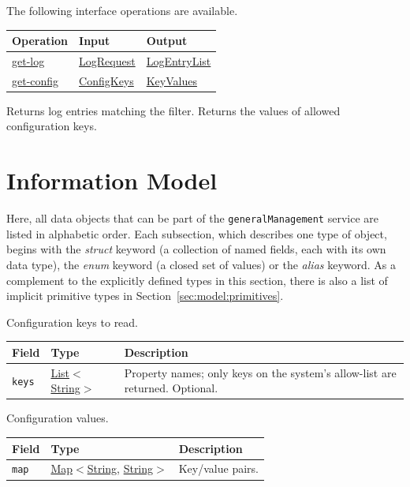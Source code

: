 \documentclass[a4paper]{arrowhead}
\newcommand{\mref}[1]{{\textcolor{ArrowheadPurple}{\hyperref[sec:model:#1]{#1}}}}
\newcommand{\oref}[1]{{\textcolor{ArrowheadBlue}{\hyperref[sec:operations:#1]{#1}}}}
\newcommand{\pref}[1]{{\textcolor{ArrowheadGrey}{\hyperref[sec:model:primitives:#1]{#1}}}}
\begin{document}
The following interface operations are available.

{\small
\begin{longtable}{|p{4.4cm}|p{5.6cm}|p{5.8cm}|}

\hline
\rowcolor{gray!33} Operation & Input & Output \\ \hline
\endhead
\oref{get-log} & \mref{LogRequest} & \mref{LogEntryList} \\ \hline
\oref{get-config} & \mref{ConfigKeys} & \mref{KeyValues} \\ \hline
\end{longtable}
}

Returns log entries matching the filter.
Returns the values of allowed configuration keys.

\newpage
\section{Information Model}
\label{sec:model}
Here, all data objects that can be part of the \texttt{generalManagement} service are listed in alphabetic order. Each
subsection, which describes one type of object, begins with the \textit{struct} keyword (a collection of named fields,
each with its own data type), the \textit{enum} keyword (a closed set of values) or the \textit{alias} keyword. As a
complement to the explicitly defined types in this section, there is also a list of implicit primitive types in
Section~\ref{sec:model:primitives}.

Configuration keys to read.

{\small
\begin{longtable}{|p{3.9cm}|p{4.4cm}|p{7.5cm}|}

\hline
\rowcolor{gray!33} Field & Type & Description \\ \hline
\endhead
\texttt{keys} & \pref{List}$<$\pref{String}$>$ & Property names; only keys on the system's allow-list are returned. Optional. \\ \hline
\end{longtable}
}

Configuration values.

{\small
\begin{longtable}{|p{3.9cm}|p{4.4cm}|p{7.5cm}|}

\hline
\rowcolor{gray!33} Field & Type & Description \\ \hline
\endhead
\texttt{map} & \pref{Map}$<$\pref{String}, \pref{String}$>$ & Key/value pairs. \\ \hline
\end{longtable}
}
\end{document}
